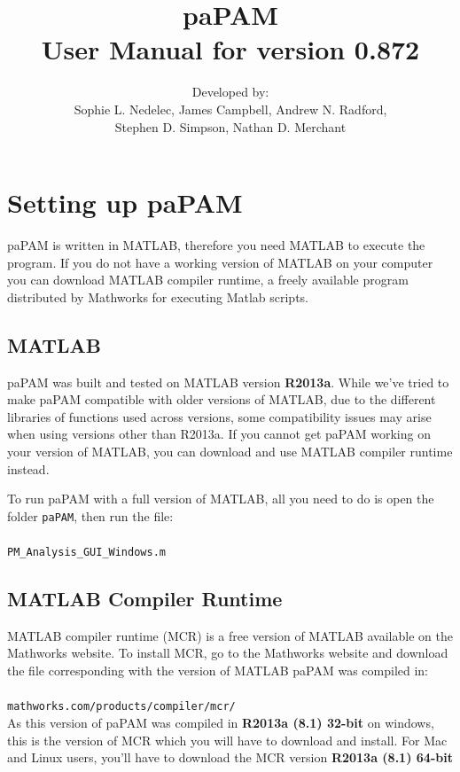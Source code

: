 \documentclass[11pt]{report}
\title{paPAM \\ \Large User Manual for version 0.872}
\author{Developed by:\\ Sophie L. Nedelec, James Campbell, Andrew N. Radford,\\Stephen D. Simpson, Nathan D. Merchant}
\begin{document}
\maketitle

\tableofcontents

\chapter{Setting up paPAM} \label{SettingUppaPAM}

paPAM is written in MATLAB, therefore you need MATLAB to execute the program.  If you do not have a working version of MATLAB on your computer you can download MATLAB compiler runtime, a freely available program distributed by Mathworks for executing Matlab scripts.

\section{MATLAB}
paPAM was built and tested on MATLAB version \textbf{R2013a}.  While we've tried to make paPAM compatible with older versions of MATLAB, due to the different libraries of functions used across versions, some compatibility issues may arise when using versions other than R2013a.  If you cannot get paPAM working on your version of MATLAB, you can download and use MATLAB compiler runtime instead.

To run paPAM with a full version of MATLAB, all you need to do is open the folder \texttt{paPAM}, then run the file:\\\\ \texttt{PM\_Analysis\_GUI\_Windows.m}

\section{MATLAB Compiler Runtime}

MATLAB compiler runtime (MCR) is a free version of MATLAB available on the Mathworks website.  To install MCR, go to the Mathworks website and download the file corresponding with the version of MATLAB paPAM was compiled in:\\\\
\texttt{mathworks.com/products/compiler/mcr/}\\

As this version of paPAM was compiled in \textbf{R2013a (8.1) 32-bit} on windows, this is the version of MCR which you will have to download and install.  For Mac and Linux users, you'll have to download the MCR version \textbf{R2013a (8.1) 64-bit}
\end{document}
